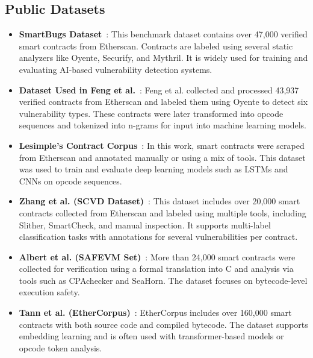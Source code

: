 \subsection*{Public Datasets}

\begin{itemize}

  \item \textbf{SmartBugs Dataset}~\cite{durieux2020empirical}: This benchmark dataset contains over 47,000 verified smart contracts from Etherscan. Contracts are labeled using several static analyzers like Oyente, Securify, and Mythril. It is widely used for training and evaluating AI-based vulnerability detection systems.

  \item \textbf{Dataset Used in Feng et al.}~\cite{feng2024interpretable}: Feng et al. collected and processed 43,937 verified contracts from Etherscan and labeled them using Oyente to detect six vulnerability types. These contracts were later transformed into opcode sequences and tokenized into n-grams for input into machine learning models.

  \item \textbf{Lesimple’s Contract Corpus}~\cite{lesimple2020master}: In this work, smart contracts were scraped from Etherscan and annotated manually or using a mix of tools. This dataset was used to train and evaluate deep learning models such as LSTMs and CNNs on opcode sequences.

  \item \textbf{Zhang et al. (SCVD Dataset)}~\cite{zhang2020scvd}: This dataset includes over 20,000 smart contracts collected from Etherscan and labeled using multiple tools, including Slither, SmartCheck, and manual inspection. It supports multi-label classification tasks with annotations for several vulnerabilities per contract.

  \item \textbf{Albert et al. (SAFEVM Set)}~\cite{albert2019safevm}: More than 24,000 smart contracts were collected for verification using a formal translation into C and analysis via tools such as CPAchecker and SeaHorn. The dataset focuses on bytecode-level execution safety.

  \item \textbf{Tann et al. (EtherCorpus)}~\cite{tann2020towards}: EtherCorpus includes over 160,000 smart contracts with both source code and compiled bytecode. The dataset supports embedding learning and is often used with transformer-based models or opcode token analysis.

\end{itemize}

